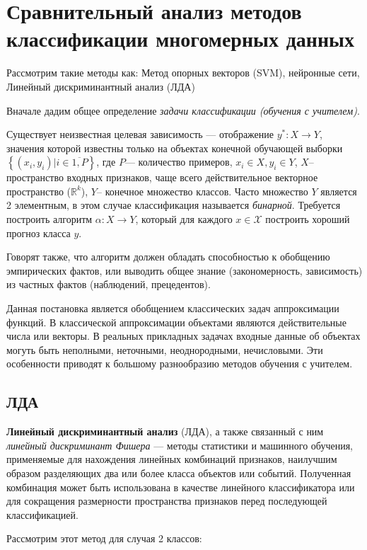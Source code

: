\section{Сравнительный анализ методов классификации многомерных данных }
\begin{annotation}
	Рассмотрим такие методы как: Метод опорных векторов (SVM), нейронные сети, Линейный дискриминантный анализ (ЛДА)
\end{annotation}

Вначале дадим общее определение \textit{задачи классификации (обучения с учителем)}.

Существует неизвестная целевая зависимость — отображение $y^{*}: X\to Y$, значения которой известны только на объектах конечной обучающей выборки $\left\{(x_i,y_i)| i \in \overline{1,P}\right\}$, где $P$--- количество примеров, $x_i \in  X, y_i \in Y$, $X$-- пространство входных признаков, чаще всего действительное векторное пространство ($\mathbb R^k$), $Y$-- конечное множество классов. Часто множество $Y$ является 2 элементным, в этом случае классификация называется \textit{бинарной}. Требуется построить  алгоритм $\alpha: X\to Y$, который для каждого $x \in \mathcal X$  построить хороший прогноз класса $y$.

Говорят также, что алгоритм должен обладать способностью к обобщению эмпирических фактов, или выводить общее знание (закономерность, зависимость) из частных фактов (наблюдений, прецедентов).

Данная постановка является обобщением классических задач аппроксимации функций. В классической аппроксимации объектами являются действительные числа или векторы. В реальных прикладных задачах входные данные об объектах могуть быть неполными, неточными, неоднородными, нечисловыми. Эти особенности приводят к большому разнообразию методов обучения с учителем.

\subsection{ЛДА}
\textbf{Линейный дискриминантный анализ} (ЛДА), а также связанный с ним \textit{линейный дискриминант Фишера} — методы статистики и машинного обучения, применяемые для нахождения линейных комбинаций признаков, наилучшим образом разделяющих два или более класса объектов или событий. Полученная комбинация может быть использована в качестве линейного классификатора или для сокращения размерности пространства признаков перед последующей классификацией.

Рассмотрим этот метод для случая 2 классов:

